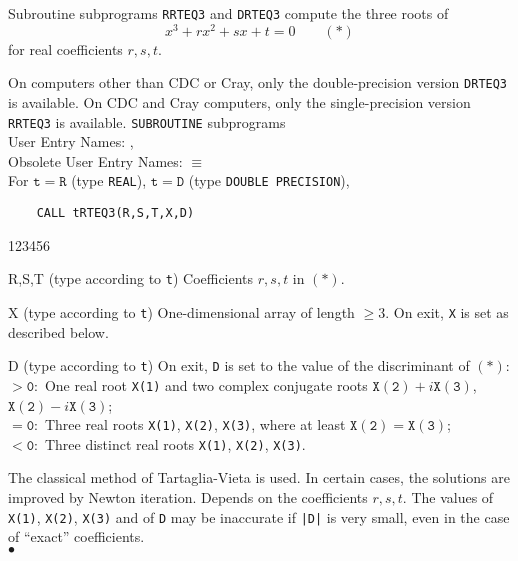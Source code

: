                    
            
\Submitter{  }                    
                
Subroutine subprograms {\tt RRTEQ3} and {\tt DRTEQ3}
compute the three roots of
$$ x^3 + rx^2 + sx + t = 0  \qquad     (*) $$
for real coefficients $r, s, t$.
\par
On computers other than CDC or Cray, only
the double-precision version {\tt DRTEQ3} is available.
On CDC and Cray computers, only the single-precision version
{\tt RRTEQ3} is available.
\Structure
{\tt SUBROUTINE} subprograms   \\
User Entry  Names: ,  \\
Obsolete User Entry Names:  $\equiv$  \\
\Usage
For $\mathtt{t=R}$ (type {\tt REAL}), $\mathtt{t=D}$ (type
{\tt DOUBLE PRECISION}),
\begin{verbatim}
    CALL tRTEQ3(R,S,T,X,D)
\end{verbatim}
\begin{DLtt}{123456}
\item[R,S,T] (type according to {\tt t}) Coefficients $r,s,t$ in $(*)$.
\item[X] (type according to {\tt t})
One-dimensional array of length $\ge 3$.
On exit, {\tt X} is set as described below.
\item[D] (type according to {\tt t})
On exit, {\tt D} is set to the value of the discriminant of $(*)$: \\
$\mathtt{> 0:}$ One real root {\tt X(1)} and two complex conjugate roots
$\mathtt{X(2)}+i\mathtt{X(3)}$, $\mathtt{X(2)}-i\mathtt{X(3)}$; \\
$\mathtt{= 0:}$ Three real roots {\tt X(1)}, {\tt X(2)}, {\tt X(3)},
 where at least $\mathtt{X(2)} = \mathtt{X(3)}$; \\
$\mathtt{< 0:}$ Three distinct real roots {\tt X(1)}, {\tt X(2)},
{\tt X(3)}.
\end{DLtt}
\Method
The classical method of Tartaglia-Vieta is used. In
certain cases, the solutions are improved by Newton iteration.
\Accuracy
Depends on the coefficients $r,s,t$. The values of
{\tt X(1)}, {\tt X(2)}, {\tt X(3)} and of {\tt D} may be inaccurate
if {\tt |D|} is very small, even in the case of ``exact'' coefficients.
\\ $\bullet$
